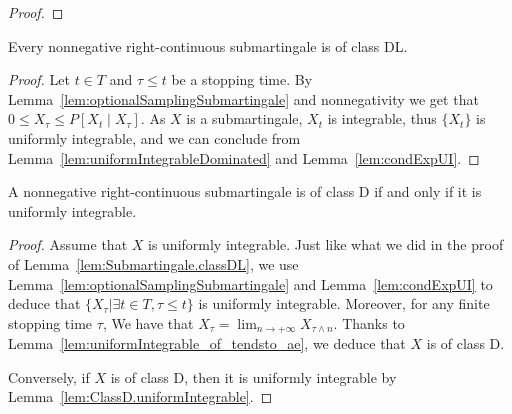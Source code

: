 \begin{proof}\leanok

\end{proof}


\begin{lemma}\label{lem:Submartingale.classDL}
  \leanok
Every nonnegative right-continuous submartingale is of class DL.
\end{lemma}

\begin{proof}
  \leanok
Let $t \in T$ and $\tau \le t$ be a stopping time. By Lemma~\ref{lem:optionalSamplingSubmartingale} and nonnegativity we get that $0 \le X_\tau \le P[X_t \mid X_\tau]$. As $X$ is a submartingale, $X_t$ is integrable, thus $\{X_t\}$ is uniformly integrable, and we can conclude from Lemma~\ref{lem:uniformIntegrableDominated} and Lemma~\ref{lem:condExpUI}.
\end{proof}


\begin{lemma}\label{lem:Submartingale.classD_iff_uniformIntegrable}
  \leanok
A nonnegative right-continuous submartingale is of class D if and only if it is uniformly integrable.
\end{lemma}

\begin{proof}
  \leanok
Assume that $X$ is uniformly integrable. Just like what we did in the proof of Lemma~\ref{lem:Submartingale.classDL}, we use Lemma~\ref{lem:optionalSamplingSubmartingale} and Lemma~\ref{lem:condExpUI} to deduce that $\{X_\tau|\exists t\in T, \tau\le t\}$ is uniformly integrable. Moreover, for any finite stopping time $\tau$, We have that $X_\tau = \lim_{n \to +\infty} X_{\tau \land n}$. Thanks to Lemma~\ref{lem:uniformIntegrable_of_tendsto_ae}, we deduce that $X$ is of class D.

Conversely, if $X$ is of class D, then it is uniformly integrable by Lemma~\ref{lem:ClassD.uniformIntegrable}.
\end{proof}


